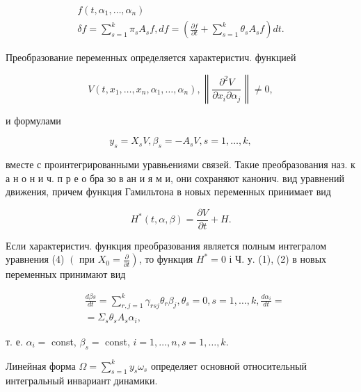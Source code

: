 \documentclass[10pt]{article}
\begin{document}
\[

\begin{gathered}

f\left(t, \alpha_{1}, \ldots, \alpha_{n}\right) \\

\delta f=\sum_{s=1}^{k} \pi_{s} A_{s} f, d f=\left(\frac{\partial f}{\partial t}+\sum_{s=1}^{k} \theta_{s} A_{s} f\right) d t .

\end{gathered}

\]



Преобразование переменных определяется характеристич. функцией



\[

V\left(t, x_{1}, \ldots, x_{n}, \alpha_{1}, \ldots, \alpha_{n}\right),\left\|\frac{\partial^{2} V}{\partial x_{i} \partial \alpha_{j}}\right\| \neq 0,

\]



и формулами



\[

y_{s}=X_{s} V, \beta_{s}=-A_{s} V, s=1, \ldots, k,

\]



вместе с проинтегрированными уравњениями связей. Такие преобразования наз. к а н о н и ч. п р е о бра зо в ан и я м и, они сохраняют канонич. вид уравнений движения, причем функция Гамильтона в новых переменных принимает вид



\[

H^{*}(t, \alpha, \beta)=\frac{\partial V}{\partial t}+H .

\]



Если характеристич. функция преобразования является полным интегралом уравнения (4) $\left(\right.$ при $\left.X_{0}=\frac{\partial}{\partial t}\right)$, то функция $H^{*}=0$ і Ч. у. (1), (2) в новых переменных принимают вид



\[

\begin{aligned}

& \frac{d \beta s}{d t}=\sum_{r, j=1}^{k} \gamma_{r s j} \theta_{r} \beta_{j}, \theta_{s}=0, s=1, \ldots, k, \frac{d \alpha_{i}}{d t}= \\

& =\Sigma_{s} \theta_{s} A_{s} \alpha_{i},

\end{aligned}

\]



т. е. $\alpha_{i}=$ const, $\beta_{s}=$ const, $i=1, \ldots, n, s=1, \ldots, k$.



Линейная форма $\Omega=\sum_{s=1}^{k} y_{s} \omega_{s}$ определяет основной относительный интегральный инвариант динамики.
\end{document}

